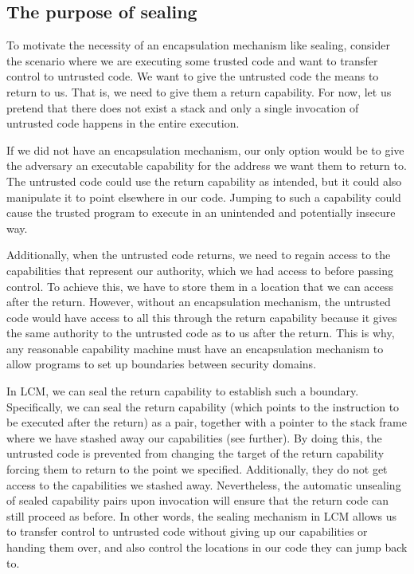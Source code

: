\documentclass[acmsmall,screen]{acmart}\settopmatter{}
\newcommand{\trgcm}{\textsc{LCM}}
\newenvironment{jversion}%
    {\color{OliveGreen}}{}
\begin{document}
\begin{jversion}
  \subsection{The purpose of sealing}
  \label{sec:purpose-sealing}
  To motivate the necessity of an encapsulation mechanism like sealing, consider the scenario where we are executing some trusted code and want to transfer control to untrusted code.
  We want to give the untrusted code the means to return to us.
  That is, we need to give them a return capability.
  For now, let us pretend that there does not exist a stack and only a single invocation of untrusted code happens in the entire execution.
  
  If we did not have an encapsulation mechanism, our only option would be to give the adversary an executable capability for the address we want them to return to.
  The untrusted code could use the return capability as intended, but it could also manipulate it to point elsewhere in our code.
  Jumping to such a capability could cause the trusted program to execute in an unintended and potentially insecure way.

  Additionally, when the untrusted code returns,  we need to regain access to the capabilities that represent our authority, which we had access to before passing control.
  To achieve this, we have to store them in a location that we can access after the return.
  However, without an encapsulation mechanism, the untrusted code would have access to all this through the return capability because it gives the same authority to the untrusted code as to us after the return.
  This is why, any reasonable capability machine must have an encapsulation mechanism to allow programs to set up boundaries between security domains.
  
  In \trgcm{}, we can seal the return capability to establish such a boundary.
  Specifically, we can seal the return capability (which points to the instruction to be executed after the return) as a pair, together with a pointer to the stack frame where we have stashed away our capabilities (see further).
  By doing this, the untrusted code is prevented from changing the target of the return capability forcing them to return to the point we specified.
  Additionally, they do not get access to the capabilities we stashed away.
  Nevertheless, the automatic unsealing of sealed capability pairs upon invocation will ensure that the return code can still proceed as before.
  In other words, the sealing mechanism in \trgcm{} allows us to transfer control to untrusted code without giving up our capabilities or handing them over, and also control the locations in our code they can jump back to.


\end{jversion}
\end{document}
